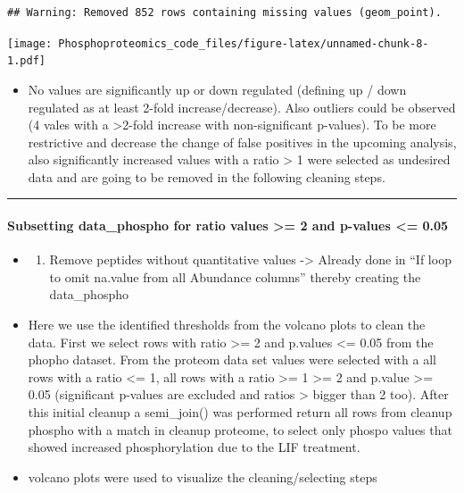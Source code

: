 \documentclass[
]{article}
\providecommand{\tightlist}{%
  \setlength{\itemsep}{0pt}\setlength{\parskip}{0pt}}
\begin{document}
\begin{verbatim}
## Warning: Removed 852 rows containing missing values (geom_point).
\end{verbatim}

\texttt{[image: Phosphoproteomics\_code\_files/figure-latex/unnamed-chunk-8-1.pdf]}

\begin{itemize}
\tightlist
\item
  No values are significantly up or down regulated (defining up / down
  regulated as at least 2-fold increase/decrease). Also outliers could
  be observed (4 vales with a \textgreater2-fold increase with
  non-significant p-values). To be more restrictive and decrease the
  change of false positives in the upcoming analysis, also significantly
  increased values with a ratio \textgreater{} 1 were selected as
  undesired data and are going to be removed in the following cleaning
  steps.
\end{itemize}

\begin{center}\rule{0.5\linewidth}{0.5pt}\end{center}

\hypertarget{subsetting-data_phospho-for-ratio-values-2-and-p-values-0.05}{%
\paragraph{Subsetting data\_phospho for ratio values \textgreater= 2 and
p-values \textless=
0.05}\label{subsetting-data_phospho-for-ratio-values-2-and-p-values-0.05}}

\begin{itemize}
\item
  \begin{enumerate}
  \def\labelenumi{\alph{enumi}.}
  \tightlist
  \item
    Remove peptides without quantitative values -\textgreater{} Already
    done in ``If loop to omit na.value from all Abundance columns''
    thereby creating the data\_phospho
  \end{enumerate}
\item
  Here we use the identified thresholds from the volcano plots to clean
  the data. First we select rows with ratio \textgreater= 2 and p.values
  \textless= 0.05 from the phopho dataset. From the proteom data set
  values were selected with a all rows with a ratio \textless= 1, all
  rows with a ratio \textgreater= 1 \textgreater= 2 and p.value
  \textgreater= 0.05 (significant p-values are excluded and ratios
  \textgreater{} bigger than 2 too). After this initial cleanup a
  semi\_join() was performed return all rows from cleanup phospho with a
  match in cleanup proteome, to select only phospo values that showed
  increased phosphorylation due to the LIF treatment.
\item
  volcano plots were used to visualize the cleaning/selecting steps
\end{itemize}
\end{document}
